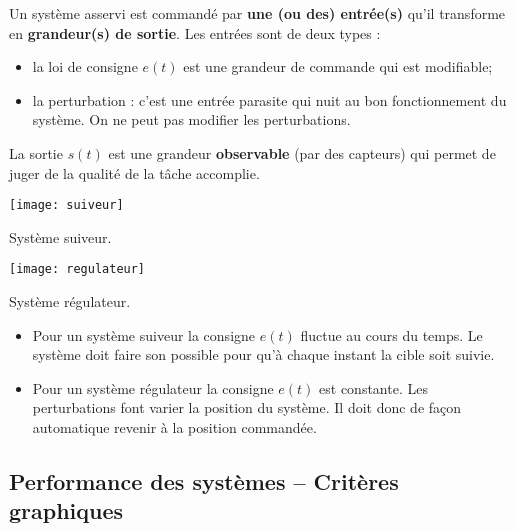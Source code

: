 \begin{defi}

Un système asservi est commandé par \textbf{une (ou des) entrée(s)} qu'il
transforme en \textbf{grandeur(s) de sortie}.
Les entrées sont de deux types : 
\begin{itemize}
\item la loi de consigne $e(t)$ est une grandeur de commande qui est modifiable;
\item la perturbation : c'est une entrée parasite qui nuit au bon
fonctionnement du système. On ne peut pas modifier les perturbations.
\end{itemize}

La sortie $s(t)$ est une grandeur \textbf{observable} (par des capteurs) qui
permet de juger de la qualité de la tâche accomplie.
\end{defi} 

\vspace{.1cm}

\begin{marginfigure}
\texttt{[image: suiveur]}
\caption{Système suiveur.}
\end{marginfigure}

\begin{marginfigure}
\texttt{[image: regulateur]}
\caption{Système régulateur.}
\end{marginfigure}

\begin{defi}
\begin{itemize}
\item Pour un système suiveur la consigne $e(t)$ fluctue au cours du temps. Le système doit faire son possible pour qu'à chaque instant la cible soit suivie.
\item Pour un système régulateur la consigne $e(t)$ est constante. Les perturbations font varier la position du système. Il doit donc de façon automatique revenir à la position commandée.
\end{itemize}
\end{defi}

\vspace{.1cm}

\subsection{Performance des systèmes -- Critères graphiques}

\vspace{.1cm}

